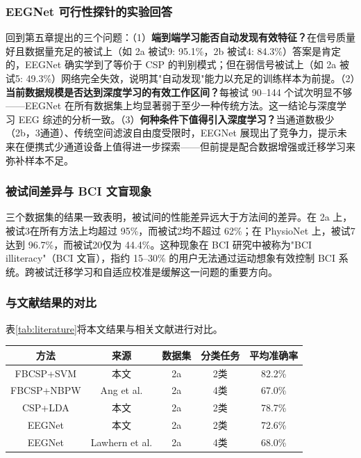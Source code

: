 \subsubsection{EEGNet 可行性探针的实验回答}

回到第五章提出的三个问题：（1）\textbf{端到端学习能否自动发现有效特征？}在信号质量好且数据量充足的被试上（如 2a 被试9: 95.1\%，2b 被试4: 84.3\%）答案是肯定的，EEGNet 确实学到了等价于 CSP 的判别模式；但在弱信号被试上（如 2a 被试5: 49.3\%）网络完全失效，说明其"自动发现"能力以充足的训练样本为前提。（2）\textbf{当前数据规模是否达到深度学习的有效工作区间？}每被试 90--144 个试次明显不够——EEGNet 在所有数据集上均显著弱于至少一种传统方法。这一结论与深度学习 EEG 综述的分析一致。（3）\textbf{何种条件下值得引入深度学习？}当通道数极少（2b，3通道）、传统空间滤波自由度受限时，EEGNet 展现出了竞争力，提示未来在便携式少通道设备上值得进一步探索——但前提是配合数据增强或迁移学习来弥补样本不足。

\subsubsection{被试间差异与 BCI 文盲现象}

三个数据集的结果一致表明，被试间的性能差异远大于方法间的差异。在 2a 上，被试3在所有方法上均超过 95\%，而被试2均不超过 62\%；在 PhysioNet 上，被试7达到 96.7\%，而被试20仅为 44.4\%。这种现象在 BCI 研究中被称为"BCI illiteracy"（BCI 文盲），指约 15--30\% 的用户无法通过运动想象有效控制 BCI 系统。跨被试迁移学习和自适应校准是缓解这一问题的重要方向。

\subsubsection{与文献结果的对比}

表\ref{tab:literature}将本文结果与相关文献进行对比。

\begin{table}[htbp]
	\centering
	\begin{tabular}{ccccc}
		\toprule
		方法 & 来源 & 数据集 & 分类任务 & 平均准确率 \\
		\midrule
		FBCSP+SVM & 本文 & 2a & 2类 & 82.2\% \\
		FBCSP+NBPW & Ang et al.\upcite{ang2012fbcsp} & 2a & 4类 & 67.0\% \\
		CSP+LDA & 本文 & 2a & 2类 & 78.7\% \\
		EEGNet & 本文 & 2a & 2类 & 72.6\% \\
		EEGNet & Lawhern et al.\upcite{lawhern2018eegnet} & 2a & 4类 & 68.0\% \\
		\bottomrule
	\end{tabular}
\end{table}

